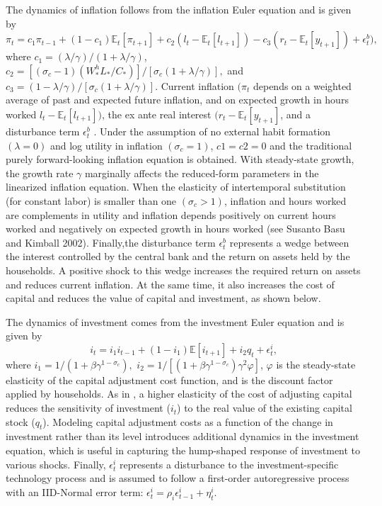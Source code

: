 \documentclass[11pt]{article}
\newcommand{\E}{\mathbb{E}}
\newcommand{\cobs}[1]{\pi_{#1}}
\newcommand{\iobs}[1]{i_{#1}}
\newcommand{\lobs}[1]{l_{#1}}
\newcommand{\robs}[1]{r_{#1}}
\newcommand{\piobs}[1]{y_{#1}}
\newcommand{\consumption}{inflation}
\newcommand{\investment}{investment}
\newcommand{\hours}{hours worked}
\newcommand{\realinterest}{real interest}
\newcommand{\labor}{labor}
\newcommand{\interest}{interest}
\begin{document}
The dynamics of \consumption{} follows from the \consumption{} Euler
equation and is given by \begin{equation}
  \cobs{t} = c_1\cobs{t-1} + (1-c_1)\E_t[\cobs{t+1}] + c_2 (\lobs{t}
  -\E_t[\lobs{t+1}]) - c_3(\robs{t}-\E_t[\piobs{t+1}])+\epsilon_t^b),
\end{equation} where \(c_1 = (\lambda/\gamma)/(1+\lambda/\gamma)\),
\(c_2 = [(\sigma_c - 1)(W_*^h L_*/C_*)] / [\sigma_c(1+\lambda/\gamma)],\)
and \(c_3 = (1-\lambda/\gamma)/[\sigma_c(1+\lambda/\gamma)]\). Current
\consumption{} \((\cobs{t}\) depends on a weighted average of past and
expected future \consumption, and on expected growth in \hours{}
\(\lobs{t}  -\E_t[\lobs{t+1}])\), the ex ante \realinterest{}
\((\robs{t}-\E_t[\piobs{t+1}]\), and a disturbance term \(\epsilon^b_t\)
. Under the assumption of no external habit formation \((\lambda=0)\)
and log utility in \consumption{} \((\sigma_c =1)\), \(c1 = c2 = 0\) and
the traditional purely forward-looking \consumption{} equation is
obtained. With steady-state growth, the growth rate \(\gamma\)
marginally affects the reduced-form parameters in the linearized
\consumption{} equation. When the elasticity of intertemporal
substitution (for constant \labor) is smaller than one
\((\sigma_c > 1)\), \consumption{} and \hours{} are complements in
utility and \consumption{} depends positively on current \hours{} and
negatively on expected growth in \hours{} (see Susanto Basu and Kimball
2002). Finally,the disturbance term \(\epsilon_t^b\) represents a wedge
between the \interest{} controlled by the central bank and the return on
assets held by the households. A positive shock to this wedge increases
the required return on assets and reduces current \consumption. At the
same time, it also increases the cost of capital and reduces the value
of capital and \investment, as shown below.

The dynamics of \investment{} comes from the \investment{} Euler
equation and is given by \begin{equation}
  \iobs{t} = i_1\iobs{t-1} + (1-i_1)\E[\iobs{t+1}] + i_2 q_t + \epsilon_t^i,
\end{equation} where \(i_1 = 1/(1+\beta\gamma^{1-\sigma_c}),\)
\(i_2 = 1/[(1+\beta\gamma^{1-\sigma_c})\gamma^2\varphi]\), \(\varphi\)
is the steady-state elasticity of the capital adjustment cost function,
and is the discount factor applied by households. As in
\citet{ChristianoEichenbaum2005}, a higher elasticity of the cost of
adjusting capital reduces the sensitivity of \investment{}
(\(\iobs{t}\)) to the real value of the existing capital stock
(\(q_t\)). Modeling capital adjustment costs as a function of the change
in \investment{} rather than its level introduces additional dynamics in
the \investment{} equation, which is useful in capturing the hump-shaped
response of \investment{} to various shocks. Finally, \(\epsilon^i_t\)
represents a disturbance to the \investment-specific technology process
and is assumed to follow a first-order autoregressive process with an
IID-Normal error term:
\(\epsilon_t^i = \rho_i\epsilon_{t-1}^i + \eta_t^i\).
\end{document}
